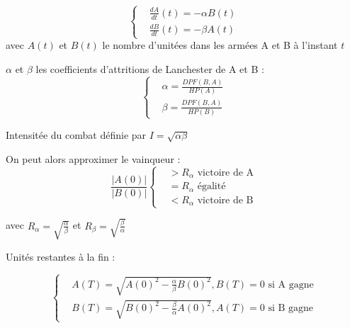 \documentclass[french]{beamer}
\begin{document}
\begin{frame}[plain]
\scriptsize
\begin{minipage}{0.4\textwidth}
	\begin{equation*}
		\left\{
		\begin{aligned}
			&\frac{dA}{dt}(t) =-\alpha B(t)\\
			&\frac{dB}{dt}(t) =-\beta A(t)
		\end{aligned}
		\right.
	\end{equation*}
	avec $A(t)$ et $B(t)$ le nombre d'unitées dans les armées A et B à l'instant $t$
	
	$\alpha$ et $\beta$ les coefficients d'attritions de Lanchester de A et B :
	\begin{equation*}
		\left\{
		\begin{aligned}
			&\alpha = \frac{DPF(B,A)}{HP(A)}\\
			&\beta = \frac{DPF(B,A)}{HP(B)}
		\end{aligned}
		\right.
	\end{equation*}
	
	Intensitée du combat définie par $I=\sqrt{\alpha\beta}$
\end{minipage}\hspace*{1cm}
\begin{minipage}{0.4\textwidth}
	On peut alors approximer le vainqueur :
	\begin{equation*}
		\frac{|A(0)|}{|B(0)|}
		\left\{
		\begin{aligned}
			&> R_\alpha \text{ victoire de A}\\
			&= R_\alpha \text{ égalité}\\
			&< R_\alpha \text{ victoire de B}
		\end{aligned}
		\right.
	\end{equation*}

avec
$R_\alpha = \sqrt{\frac\alpha\beta}$ et 
$R_\beta = \sqrt{\frac\beta\alpha}$

Unités restantes à la fin : 

\begin{equation*}
	\left\{
	\begin{aligned}
		&A(T) = \sqrt{A(0)^2-\frac\alpha\beta B(0)^2}, B(T)=0\text{ si A gagne}\\
		&B(T) = \sqrt{B(0)^2-\frac\beta\alpha A(0)^2}, A(T)=0\text{ si B gagne}
	\end{aligned}
	\right.
\end{equation*}
\end{minipage}
\end{frame}
\end{document}
